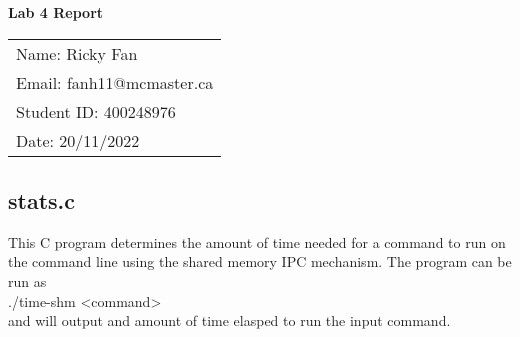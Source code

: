 \documentclass[11pt,fleqn]{article}
\begin{document}
\begin{center}
	{\Large \textbf{Lab 4 Report}}\\[6mm]
	\begin{tabular}{l}
        {\large Name: Ricky Fan}       \\
		{\large Email: fanh11@mcmaster.ca} \\
		{\large Student ID: 400248976}    \\
		{\large Date: 20/11/2022}
	\end{tabular}

\end{center}

\medskip

\subsection*{stats.c}
This C program determines the amount of time needed for a command to run 
on the command line using the shared memory IPC mechanism. 
The program can be run as \\

./time-shm \textless command\textgreater \\

\noindent
and will output and amount of time elasped to run the input command. 



\end{document}
